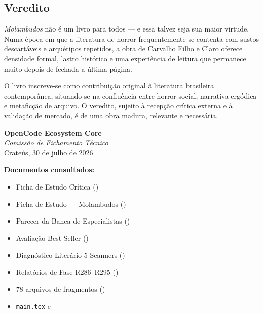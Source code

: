 \documentclass[14pt,openany]{extbook}
\newcommand{\ornamento}{\begin{center}\pgfornament[width=3.6cm,color=customgold]{85}\end{center}}
\begin{document}
\subsection*{Veredito}

\vspace{0.4em}
\noindent\textit{Molambudos} não é um livro para todos --- e essa talvez seja sua maior virtude. Numa época em que a literatura de horror frequentemente se contenta com sustos descartáveis e arquétipos repetidos, a obra de Carvalho Filho e Claro oferece densidade formal, lastro histórico e uma experiência de leitura que permanece muito depois de fechada a última página.

\vspace{0.4em}
\noindent O livro inscreve-se como contribuição original à literatura brasileira contemporânea, situando-se na confluência entre horror social, narrativa ergódica e metaficção de arquivo. O veredito, sujeito à recepção crítica externa e à validação de mercado, é de uma obra madura, relevante e necessária.

\vspace{0.8em}
\ornamento

\vspace{0.6em}
\noindent\hfill\textbf{OpenCode Ecosystem Core}\\
\noindent\hfill\textit{Comissão de Fichamento Técnico}\\
\noindent\hfill Crateús, 30 de julho de 2026

\vspace{2em}

\noindent\textbf{Documentos consultados:}
\begin{itemize}
\item Ficha de Estudo Crítica (\texttt{})
\item Ficha de Estudo --- Molambudos (\texttt{})
\item Parecer da Banca de Especialistas (\texttt{})
\item Avaliação Best-Seller (\texttt{})
\item Diagnóstico Literário 5 Scanners (\texttt{})
\item Relatórios de Fase R286--R295 (\texttt{})
\item 78 arquivos de fragmentos (\texttt{})
\item \texttt{main.tex} e \texttt{}
\end{itemize}
\end{document}
